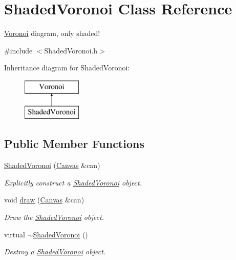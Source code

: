 \hypertarget{class_shaded_voronoi}{}\section{Shaded\+Voronoi Class Reference}
\label{class_shaded_voronoi}


\hyperlink{class_voronoi}{Voronoi} diagram, only shaded!  




{\ttfamily \#include $<$Shaded\+Voronoi.\+h$>$}

Inheritance diagram for Shaded\+Voronoi\+:\begin{figure}[H]
\begin{center}
\leavevmode
\includegraphics[height=2.000000cm]{class_shaded_voronoi}
\end{center}
\end{figure}
\subsection*{Public Member Functions}
\begin{DoxyCompactItemize}
\item 
\hyperlink{class_shaded_voronoi_a3005ac828c9b8cd099e369c89775c9c9}{Shaded\+Voronoi} (\hyperlink{classtsgl_1_1_canvas}{Canvas} \&can)
\begin{DoxyCompactList}\small\item\em Explicitly construct a \hyperlink{class_shaded_voronoi}{Shaded\+Voronoi} object. \end{DoxyCompactList}\item 
void \hyperlink{class_shaded_voronoi_a5946cbfff9ea57f504cba8235ba814be}{draw} (\hyperlink{classtsgl_1_1_canvas}{Canvas} \&can)
\begin{DoxyCompactList}\small\item\em Draw the \hyperlink{class_shaded_voronoi}{Shaded\+Voronoi} object. \end{DoxyCompactList}\item 
virtual \hyperlink{class_shaded_voronoi_a7f006a50875f62677e209763b6ae2709}{$\sim$\+Shaded\+Voronoi} ()
\begin{DoxyCompactList}\small\item\em Destroy a \hyperlink{class_shaded_voronoi}{Shaded\+Voronoi} object. \end{DoxyCompactList}\end{DoxyCompactItemize}
